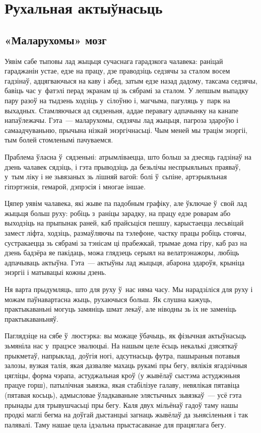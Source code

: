 \chapter{Рухальная актыўнасьць}

\section{«Маларухомы» мозг}

Уявім сабе тыповы лад жыцьця сучаснага гарадзкога чалавека: раніцай гараджанін устае, едзе на працу, дзе праводзіць седзячы за сталом восем гадзінаў, адцягваючыся на каву і абед, затым едзе назад дадому, таксама седзячы, бавіць час у~фатэлі перад экранам ці зь сябрамі за сталом. У лепшым выпадку пару разоў на тыдзень ходзіць у~сілоўню і, магчыма, пагуляць у~парк на выхадных. Стамляючыся ад сядзеньня, аддае перавагу адпачынку на канапе напаўлежачы. Гэта~--- маларухомы, сядзячы лад жыцьця, пагроза здароўю і самаадчуваньню, прычына нізкай энэргічнасьці. Чым меней мы трацім энэргіі, тым болей стомленымі пачуваемся.

Праблема ўласна ў~сядзеньні: атрымліваецца, што больш за дзесяць гадзінаў на дзень чалавек сядзіць, і гэта прыводзіць да безьлічы неспрыяльных праяваў, у~тым ліку і не зьвязаных зь лішняй вагой: болі ў~сьпіне, артэрыяльная гіпэртэнзія, гемарой, дэпрэсія і многае іншае.

Цяпер уявім чалавека, які жыве па падобным графіку, але ўключае ў~свой лад жыцьця больш руху: робіць з~раніцы зарадку, на працу едзе роварам або выходзіць на прыпынак раней, каб прайсьціся пешшу, карыстаецца лесьвіцай замест ліфта, ходзіць, размаўляючы па тэлефоне, частку працы робіць стоячы, сустракаецца зь сябрамі за тэнісам ці прабежкай, трымае дома гіру, каб раз на дзень бадзёра яе пакідаць, можа глядзець серыял на велатрэнажоры, любіць адпачываць актыўна. Гэта~--- актыўны лад жыцьця, абарона здароўя, крыніца энэргіі і матывацыі кожны дзень.

Ня варта прыдумляць, што для руху ў~нас няма часу. Мы нарадзіліся для руху і можам паўнавартасна жыць, рухаючыся больш. Як слушна кажуць, практыкаваньні могуць замяніць шмат лекаў, але ніводны зь іх не заменіць практыкаваньняў.

Паглядзіце на сябе ў~люстэрка: вы можаце ўбачыць, як фізычная актыўнасьць зьмяніла нас у~працэсе эвалюцыі. На нашым целе ёсьць некалькі дзясяткаў прыкметаў, напрыклад, доўгія ногі, адсутнасьць футра, пашыраныя потавыя залозы, вузкая талія, якая дазваляе махаць рукамі пры бегу, вялікія ягадзічныя цягліцы, форма чэрапа, астуджальная кроў (у жывёлаў сыстэма астуджэньня працуе горш), патылічная зьвязка, якая стабілізуе галаву, невялікая пятавіца (пятавая косьць), адмысловае ўладкаваньне элястычных зьвязкаў~--- усё гэта прынады для трывушчасьці пры бегу. Каля двух мільёнаў гадоў таму нашы продкі маглі бегма на доўгай дыстанцыі загнаць жывёлаў да зьнясіленьня і так палявалі. Таму нашае цела ідэальна прыстасаванае для працяглага бегу.

